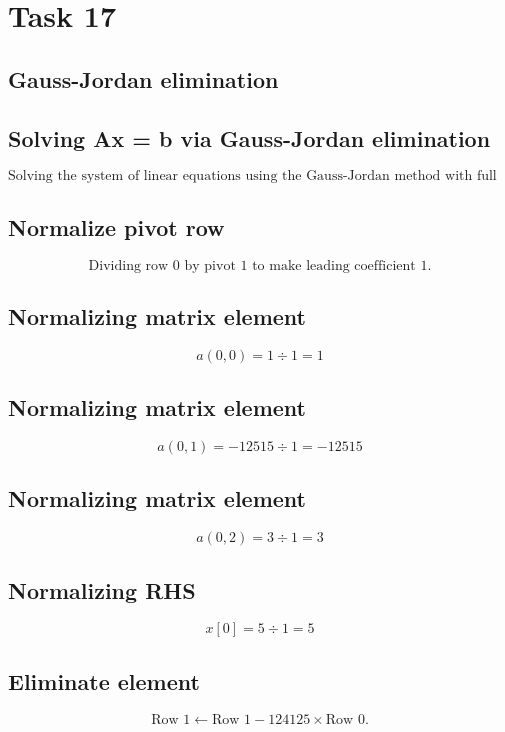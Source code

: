 \documentclass{article}
\begin{document}
\hrulefill
\bigskip

\section*{Task 17}

\subsection*{Gauss-Jordan elimination}
\subsection*{ \vspace{1em} Solving Ax = b via Gauss-Jordan elimination}
\[
\text{Solving the system of linear equations using the Gauss-Jordan method with full row reduction.}
\]
\subsection*{ \vspace{1em} Normalize pivot row}
\[
\text{Dividing row } 0 \text{ by pivot } 1 \text{ to make leading coefficient } 1.
\]
\subsection*{ \vspace{1em} Normalizing matrix element}
\[
a( 0,0 ) = 1 \div 1 = 1
\]
\subsection*{ \vspace{1em} Normalizing matrix element}
\[
a( 0,1 ) = -12515 \div 1 = -12515
\]
\subsection*{ \vspace{1em} Normalizing matrix element}
\[
a( 0,2 ) = 3 \div 1 = 3
\]
\subsection*{ \vspace{1em} Normalizing RHS}
\[
x[0] = 5 \div 1 = 5
\]
\subsection*{ \vspace{1em} Eliminate element}
\[
\text{Row } 1 \leftarrow \text{Row }1 - 124125 \times \text{Row } 0.
\]
\end{document}
